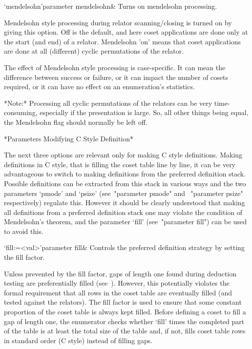 \>`mendelsohn'{parameter mendelsohn}&
Turns on mendelsohn processing.

Mendelsohn style processing  during relator scanning/closing is turned
on  by  giving  this option.   Off  is  the  default, and  here  coset
applications  are done  only  at the  start  (and end)  of a  relator.
Mendelsohn  'on'  means  that  coset  applications  are  done  at  all
(different)  cyclic permutations of  the relator.   

The effect  of Mendelsohn style  processing is case-specific.   It can
mean the difference  between success or failure, or  it can impact the
number  of  cosets   required,  or  it  can  have   no  effect  on  an
enumeration's statistics.

*Note:* Processing all cyclic permutations of the relators can be very
time-consuming,  especially if  the  presentation is  large.  So,  all
other things being equal, the  Mendelsohn flag should normally be left
off.

*Parameters Modifying C Style Definition*

The  next  three  options  are   relevant  only  for  making  C  style
definitions.  Making definitions in C style, that is filling the coset
table line  by line, it can  be very advantageous to  switch to making
definitions from the preferred definition stack.  Possible definitions
can  be  extracted  from  this  stack  in various  ways  and  the  two
parameters `pmode'  and `psize' (see~"parameter  pmode" and ~"parameter
psize"  respectively)  regulate this.  However  it  should be  clearly
understood that  making  all definitions  from  a preferred  definition
stack one may  violate the condition of Mendelsohn's  theorem, and the
parameter `fill' (see~"parameter fill") can be used to avoid this.

\>`fill:=<val>'{parameter fill}&
Controls the preferred definition strategy by setting the fill factor.

Unless prevented by  the fill factor, gaps of  length one found during
deduction   testing   are   preferentially  filled   (see~\cite{Hav91}).
However,  this potentially  violates the  formal requirement  that all
rows in the coset table  are eventually filled (and tested against the
relators).   The fill  factor is  used  to ensure  that some  constant
proportion of the coset table  is always kept filled.  Before defining
a coset  to fill a  gap of length  one, the enumerator  checks whether
`fill' times  the completed part  of the table  is at least  the total
size of  the table  and, if  not, fills coset  table rows  in standard
order (C style) instead of filling gaps.

